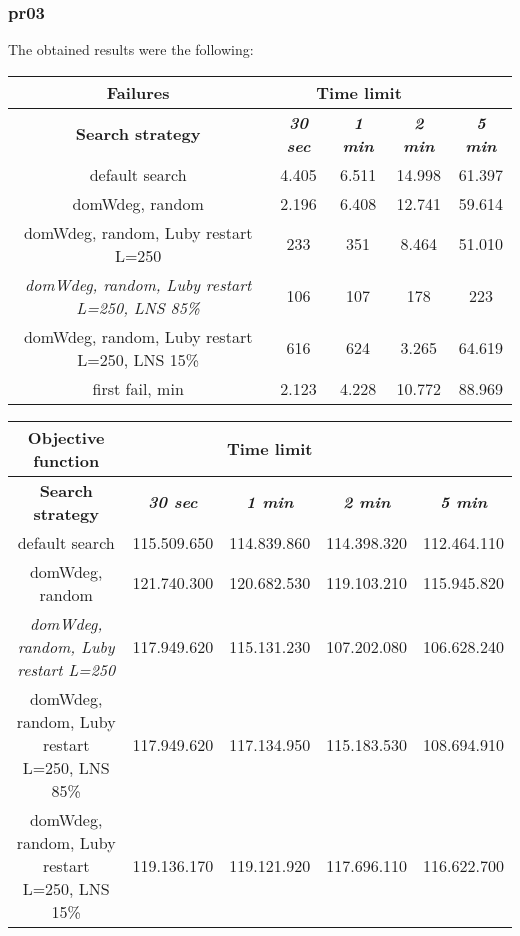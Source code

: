 \subsubsection{pr03}
The obtained results were the following:
{
\renewcommand{\arraystretch}{2}
\begin{longtable}[h]{| c | c | c | c | c |}
    \hline
    \textbf{Failures} & \multicolumn{3}{c}{Time limit} & \\
    \hline
    \textbf{Search strategy} & \textbf{\textit{30 sec}} & \textbf{\textit{1 min}} & \textbf{\textit{2 min}} & \textbf{\textit{5 min}} \\
    \hline
    \endhead
    default search                                         &  4.405 &  6.511 & 14.998 &  61.397 \\
    \hline
    domWdeg, random                                        &  2.196 &  6.408 & 12.741 &  59.614 \\
    \hline
    domWdeg, random, Luby restart L=250                    &   233 &   351 &  8.464 &  51.010 \\
    \hline
    \textit{domWdeg, random, Luby restart L=250, LNS 85\%} &   106 &   107 &   178 &    223 \\
    \hline
    domWdeg, random, Luby restart L=250, LNS 15\%          &   616 &   624 &  3.265 &  64.619 \\
    \hline
    first fail, min                                        &  2.123 &  4.228 & 10.772 &  88.969 \\
    \hline
\end{longtable}
}

{
\renewcommand{\arraystretch}{2}
\begin{longtable}[h]{| c | c | c | c | c |}
    \hline
    \textbf{Objective function} & \multicolumn{3}{c}{Time limit} & \\
    \hline
    \textbf{Search strategy} & \textbf{\textit{30 sec}} & \textbf{\textit{1 min}} & \textbf{\textit{2 min}} & \textbf{\textit{5 min}} \\
    \hline
    \endhead
    default search                                & 115.509.650 & 114.839.860 & 114.398.320 & 112.464.110 \\
    \hline
    domWdeg, random                               & 121.740.300 & 120.682.530 & 119.103.210 & 115.945.820 \\
    \hline
    \textit{domWdeg, random, Luby restart L=250}  & 117.949.620 & 115.131.230 & 107.202.080 & 106.628.240 \\
    \hline
    domWdeg, random, Luby restart L=250, LNS 85\% & 117.949.620 & 117.134.950 & 115.183.530 & 108.694.910 \\
    \hline
    domWdeg, random, Luby restart L=250, LNS 15\% & 119.136.170 & 119.121.920 & 117.696.110 & 116.622.700 \\
    \hline
\end{longtable}
}

